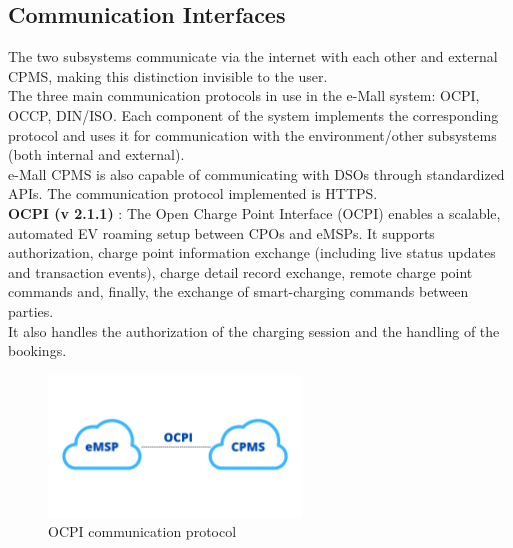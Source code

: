 \documentclass[12pt]{report}
\begin{document}
\newpage
\subsection{Communication Interfaces}
The two subsystems communicate via the internet with each other and external CPMS, making this distinction invisible to the user.\\
The three main communication protocols in use in the e-Mall system: OCPI, OCCP, DIN/ISO. Each component of the system implements the corresponding protocol and uses it for communication with the environment/other subsystems (both internal and external).\\
e-Mall CPMS is also capable of communicating with DSOs through standardized APIs. The communication protocol implemented is HTTPS.\\

\textbf{OCPI (v 2.1.1)} : The Open Charge Point Interface (OCPI) enables a scalable, automated EV roaming setup between CPOs and eMSPs. It supports authorization, charge point information exchange (including live status updates and transaction events), charge detail record exchange, remote charge point commands and, finally, the exchange of smart-charging commands between parties.\\
It also handles the authorization of the charging session and the handling of the bookings.
\begin{figure}[h]
    \centering
    \includegraphics[width = 0.6\textwidth]{assets/OCPI.png}
    \caption{OCPI communication protocol}

\end{figure}
\end{document}
